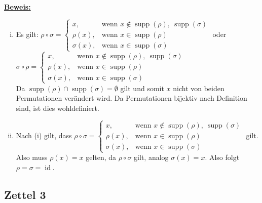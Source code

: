\documentclass[a4paper, pagesize=pdftex, pdftex, twoside, headsepline, index=totoc,toc=listof, fontsize=10pt, cleardoublepage=empty, headinclude, DIV=13, BCOR=13mm]{scrartcl}
\newcommand{\bet}[1]{\uline{\textbf{#1}}} %
\DeclareMathOperator{\id}{id} %
\DeclareMathOperator{\supp}{supp}
\begin{document}
\bet{Beweis:}\\
\begin{enumerate}[(i)]
	\item Es gilt: $\rho\circ\sigma=\left\{\begin{array}{cl} x, & \text{wenn } x\notin \supp(\rho),~\supp(\sigma)\\ \rho(x), & \text{wenn } x\in \supp(\rho)\\ \sigma(x), & \text{wenn } x\in \supp(\sigma) \end{array}\right.$
	oder 
	$\sigma\circ\rho=\left\{\begin{array}{cl} x, & \text{wenn } x\notin \supp(\rho),~\supp(\sigma)\\ \rho(x), & \text{wenn } x\in \supp(\rho)\\ \sigma(x), & \text{wenn } x\in \supp(\sigma) \end{array}\right.$\\
	
	Da $\supp(\rho)\cap \supp(\sigma)=\emptyset$ gilt und somit $x$ nicht von beiden Permutationen verändert wird. Da Permutationen bijektiv nach Definition sind, ist dies wohldefiniert.
	\item Nach (i) gilt, dass $\rho\circ\sigma=\left\{\begin{array}{cl} x, & \text{wenn } x\notin \supp(\rho),~\supp(\sigma)\\ \rho(x), & \text{wenn } x\in \supp(\rho)\\ \sigma(x), & \text{wenn } x\in \supp(\sigma) \end{array}\right.$ gilt.\\
	
	Also muss $\rho(x)=x$ gelten, da $\rho\circ\sigma$ gilt, analog $\sigma(x)=x$. Also folgt $\rho=\sigma=\id$.
\end{enumerate}

\subsection*{Zettel 3}
\label{sub:zettel_3alg}










\printindex
\listoffigures
\end{document}
